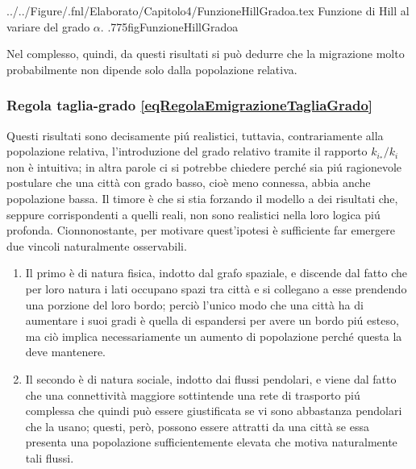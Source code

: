           {../../Figure/.fnl/Elaborato/Capitolo4/FunzioneHillGradoa.tex}
          {Funzione di Hill al variare del grado \(\alpha\).}
          {.775\linewidth}{figFunzioneHillGradoa}

        Nel complesso, quindi, da questi risultati si può dedurre che la migrazione molto probabilmente non dipende solo dalla popolazione relativa.

      \subsubsection{Regola taglia-grado \ref{eqRegolaEmigrazioneTagliaGrado}}

        Questi risultati sono decisamente piú realistici, tuttavia, contrariamente alla popolazione relativa, l'introduzione del grado relativo tramite il rapporto \(k_{i_*}/k_i\) non è intuitiva; in altra parole ci si potrebbe chiedere perché sia piú ragionevole postulare che una città con grado basso, cioè meno connessa, abbia anche popolazione bassa. Il timore è che si stia forzando il modello a dei risultati che, seppure corrispondenti a quelli reali, non sono realistici nella loro logica piú profonda. Cionnonostante, per motivare quest'ipotesi è sufficiente far emergere due vincoli naturalmente osservabili.

        \begin{enumerate}[
          label=V\arabic*,
        ]
          \item\label{ossRETGVincoloFisico} Il primo è di natura fisica, indotto dal grafo spaziale, e discende dal fatto che per loro natura i lati occupano spazi tra città e si collegano a esse prendendo una porzione del loro bordo; perciò l'unico modo che una città ha di aumentare i suoi gradi è quella di espandersi per avere un bordo piú esteso, ma ciò implica necessariamente un aumento di popolazione perché questa la deve mantenere.
          \item\label{ossRETGVincoloSociale} Il secondo è di natura sociale, indotto dai flussi pendolari, e viene dal fatto che una connettività maggiore sottintende una rete di trasporto piú complessa che quindi può essere giustificata se vi sono abbastanza pendolari che la usano; questi, però, possono essere attratti da una città se essa presenta una popolazione sufficientemente elevata che motiva naturalmente tali flussi.
        \end{enumerate}

